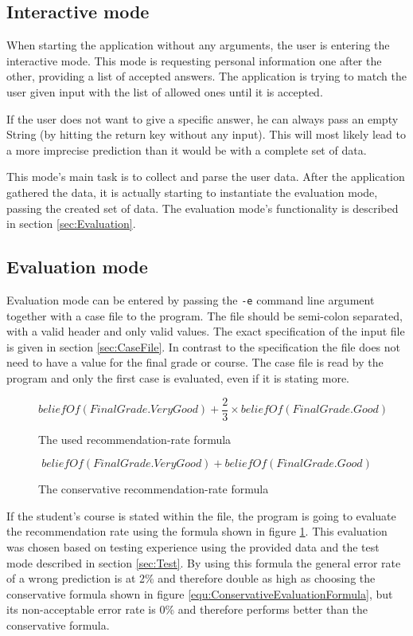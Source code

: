 \documentclass[%
	pdftex,
	oneside,        %
	11pt,           %
	parskip=half,   %
	headsepline,    %
	footsepline,    %
	abstracton,     %
	USenglish,      %
	a4paper,        %
]{report}
\begin{document}
\subsection{Interactive mode}
\label{sec:Interactive}
When starting the application without any arguments, the user is entering the interactive mode. This mode is requesting personal information one after the other, providing a list of accepted answers. The application is trying to match the user given input with the list of allowed ones until it is accepted.

If the user does not want to give a specific answer, he can always pass an empty String (by hitting the return key without any input). This will most likely lead to a more imprecise prediction than it would be with a complete set of data.

This mode's main task is to collect and parse the user data. After the application gathered the data, it is actually starting to instantiate the evaluation mode, passing the created set of data. The evaluation mode's functionality is described in section \vref{sec:Evaluation}.

\subsection{Evaluation mode}
\label{sec:Evaluation}
Evaluation mode can be entered by passing the \texttt{-e} command line argument together with a case file to the program. The file should be semi-colon separated, with a valid header and only valid values. The exact specification of the input file is given in section \vref{sec:CaseFile}. In contrast to the specification the file does not need to have a value for the final grade or course. The case file is read by the program and only the first case is evaluated, even if it is stating more.

\begin{figure}
    \[ beliefOf(FinalGrade.VeryGood) + \frac{2}{3} \times beliefOf(FinalGrade.Good) \]
    \caption{The used recommendation-rate formula}
    \label{equ:EvaluationFormula}
\end{figure}

\begin{figure}
    \[ beliefOf(FinalGrade.VeryGood) + beliefOf(FinalGrade.Good) \]
    \caption{The conservative recommendation-rate formula}
    \label{equ:ConservativeEvaluationFormula}
\end{figure}

If the student's course is stated within the file, the program is going to evaluate the recommendation rate using the formula shown in figure \ref{equ:EvaluationFormula}. This evaluation was chosen based on testing experience using the provided data and the test mode described in section \vref{sec:Test}. By using this formula the general error rate of a wrong prediction is at 2\% and therefore double as high as choosing the conservative formula shown in figure \vref{equ:ConservativeEvaluationFormula}, but its non-acceptable error rate is 0\% and therefore performs better than the conservative formula.
\end{document}
